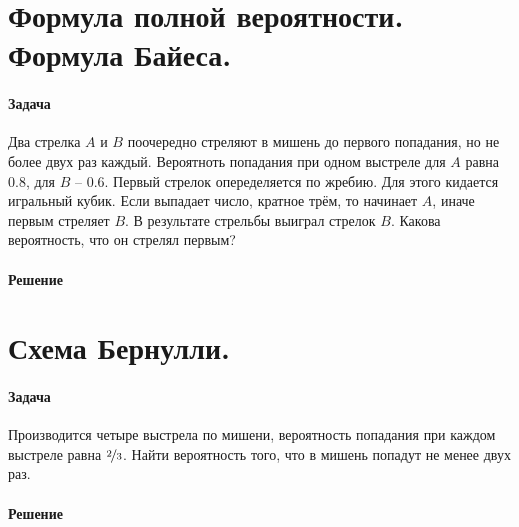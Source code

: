 \documentclass[fleqn]{article}
\begin{document}
\section{Формула полной вероятности. Формула Байеса.}
\paragraph{Задача}
Два стрелка \(A\) и \(B\) поочередно стреляют в мишень до первого попадания, но не более двух раз каждый. Вероятноть попадания при одном выстреле для \(A\) равна \(0.8\), для \(B\) -- \(0.6\). Первый стрелок опеределяется по жребию. Для этого кидается игральный кубик. Если выпадает число, кратное трём, то начинает \(A\), иначе первым стреляет \(B\). В результате стрельбы выиграл стрелок \(B\). Какова вероятность, что он стрелял первым?
\paragraph{Решение}
  
\section{Схема Бернулли.}
\paragraph{Задача}
Производится четыре выстрела по мишени, вероятность попадания при каждом выстреле равна \(\nicefrac{2}{3}\). Найти вероятность того, что в мишень попадут не менее двух раз.
\paragraph{Решение}
\end{document}
